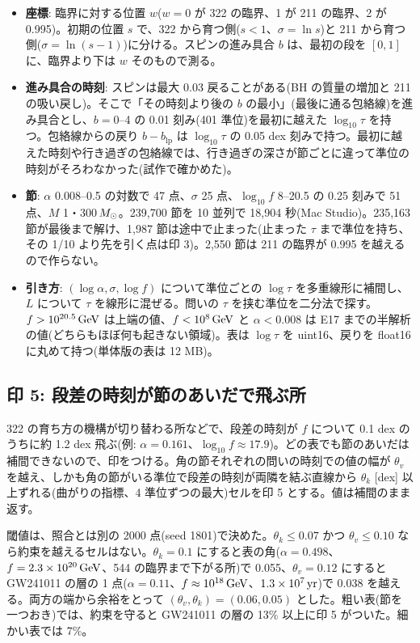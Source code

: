 \begin{itemize}
\item \textbf{座標}: 臨界に対する位置 $w$($w=0$ が 322 の臨界、1 が 211 の臨界、2 が 0.995)。初期の位置 $s$ で、322 から育つ側($s<1$、$\sigma=\ln s$)と 211 から育つ側($\sigma=\ln(s-1)$)に分ける。スピンの進み具合 $b$ は、最初の段を $[0,1]$ に、臨界より下は $w$ そのもので測る。
\item \textbf{進み具合の時刻}: スピンは最大 0.03 戻ることがある(BH の質量の増加と 211 の吸い戻し)。そこで「その時刻より後の $b$ の最小」(最後に通る包絡線)を進み具合とし、$b=0$--4 の 0.01 刻み(401 準位)を最初に越えた $\log_{10}\tau$ を持つ。包絡線からの戻り $b-b_\mathrm{lp}$ は $\log_{10}\tau$ の 0.05 dex 刻みで持つ。最初に越えた時刻や行き過ぎの包絡線では、行き過ぎの深さが節ごとに違って準位の時刻がそろわなかった(試作で確かめた)。
\item \textbf{節}: $\alpha$ 0.008--0.5 の対数で 47 点、$\sigma$ 25 点、$\log_{10}f$ 8--20.5 の 0.25 刻みで 51 点、$M$ 1・300$\,M_\odot$。239,700 節を 10 並列で 18,904 秒(Mac Studio)。235,163 節が最後まで解け、1,987 節は途中で止まった(止まった $\tau$ まで準位を持ち、その 1/10 より先を引く点は印 3)。2,550 節は 211 の臨界が 0.995 を越えるので作らない。
\item \textbf{引き方}: $(\log\alpha,\sigma,\log f)$ について準位ごとの $\log\tau$ を多重線形に補間し、$L$ について $\tau$ を線形に混ぜる。問いの $\tau$ を挟む準位を二分法で探す。$f>10^{20.5}\,\mathrm{GeV}$ は上端の値、$f<10^8\,\mathrm{GeV}$ と $\alpha<0.008$ は E17 までの半解析の値(どちらもほぼ何も起きない領域)。表は $\log\tau$ を uint16、戻りを float16 に丸めて持つ(単体版の表は 12 MB)。
\end{itemize}

\subsection{印 5: 段差の時刻が節のあいだで飛ぶ所}

322 の育ち方の機構が切り替わる所などで、段差の時刻が $f$ について 0.1 dex のうちに約 1.2 dex 飛ぶ(例: $\alpha=0.161$、$\log_{10}f\approx17.9$)。どの表でも節のあいだは補間できないので、印をつける。角の節それぞれの問いの時刻での値の幅が $\theta_v$ を越え、しかも角の節がいる準位で段差の時刻が両隣を結ぶ直線から $\theta_k$ [dex] 以上ずれる(曲がりの指標、4 準位ずつの最大)セルを印 5 とする。値は補間のまま返す。

閾値は、照合とは別の 2000 点(seed 1801)で決めた。$\theta_k\le0.07$ かつ $\theta_v\le0.10$ なら約束を越えるセルはない。$\theta_k=0.1$ にすると表の角($\alpha=0.498$、$f=2.3\times10^{20}\,\mathrm{GeV}$、544 の臨界まで下がる所)で 0.055、$\theta_v=0.12$ にすると GW241011 の層の 1 点($\alpha=0.11$、$f\approx10^{18}\,\mathrm{GeV}$、$1.3\times10^7\,\mathrm{yr}$)で 0.038 を越える。両方の端から余裕をとって $(\theta_v,\theta_k)=(0.06,0.05)$ とした。粗い表(節を一つおき)では、約束を守ると GW241011 の層の 13\% 以上に印 5 がついた。細かい表では 7\%。

